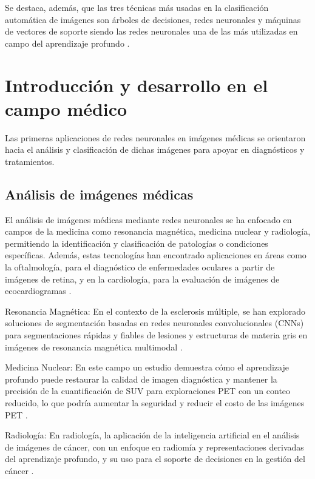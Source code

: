 Se destaca, además, que las tres técnicas más usadas en la clasificación automática de imágenes son árboles de decisiones, redes neuronales y máquinas de vectores de soporte siendo las redes neuronales una de las más utilizadas en campo del aprendizaje profundo . 

\section{Introducción y desarrollo en el campo médico}

Las primeras aplicaciones de redes neuronales en imágenes médicas se orientaron hacia el análisis y clasificación de dichas imágenes para apoyar 
en diagnósticos y tratamientos. 

\subsection{Análisis de imágenes médicas}

El análisis de imágenes médicas mediante redes neuronales se ha enfocado en campos de la medicina como resonancia magnética, medicina nuclear y radiología, permitiendo la identificación y clasificación de patologías o condiciones específicas. Además, estas tecnologías han encontrado aplicaciones en áreas como la oftalmología, para el diagnóstico de enfermedades oculares a partir de imágenes de retina, y en la cardiología, para la evaluación de imágenes de ecocardiogramas .

\begin{description}   
    \item Resonancia Magnética: En el contexto de la esclerosis múltiple, se han explorado soluciones de segmentación basadas en redes neuronales convolucionales (CNNs) para segmentaciones rápidas y fiables de lesiones y estructuras de materia gris en imágenes de resonancia magnética multimodal .
    
    \item Medicina Nuclear:  En este campo un estudio demuestra cómo el aprendizaje profundo puede restaurar la calidad de imagen diagnóstica y mantener la precisión de la cuantificación de SUV para exploraciones PET con un conteo reducido, lo que podría aumentar la seguridad y reducir el costo de las imágenes PET .
    
    \item Radiología: En radiología, la aplicación de la inteligencia artificial en el análisis de imágenes de cáncer, con un enfoque en radiomía y representaciones derivadas del aprendizaje profundo, y su uso para el soporte de decisiones en la gestión del cáncer .
\end{description}

